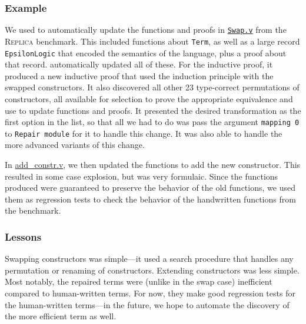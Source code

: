 \subsubsection{Example}

We used \toolname to automatically update the functions and proofs in \href{https://github.com/uwplse/pumpkin-pi/blob/master/plugin/coq/Swap.v}{\lstinline{Swap.v}} from the \textsc{Replica} benchmark.
This included functions about \lstinline{Term}, as well as a large record \lstinline{EpsilonLogic} that encoded the semantics of the language,
plus a proof about that record.
\toolname automatically updated all of these. For the inductive proof, it produced
a new inductive proof that used the induction principle with the swapped constructors.
It also discovered all other 23 type-correct permutations of constructors, all available for selection to 
prove the appropriate equivalence and use to update functions and proofs.
It presented the desired transformation as the first option in the list, so that all we had to do
was pass the argument \lstinline{mapping 0} to \lstinline{Repair module} for it to handle this change.
It was also able to handle the more advanced variants of this change.

In \href{https://github.com/uwplse/pumpkin-pi/blob/master/plugin/coq/playground/add_constr.v}{add_constr.v},
we then updated the functions to add the new constructor.
This resulted in some case explosion, but was very formulaic.
Since the functions \toolname produced were guaranteed to preserve the behavior of the old functions,
we used them as regression tests to check the behavior of the handwritten functions from the benchmark.

\subsubsection{Lessons}

Swapping constructors was simple---it used a search procedure that handles
any permutation or renaming of constructors.
Extending constructors was less simple.
Most notably, the repaired terms were (unlike in the swap case) inefficient compared to human-written terms.
For now, they make good regression tests for the human-written terms---in the future,
we hope to automate the discovery of the more efficient term as well.

